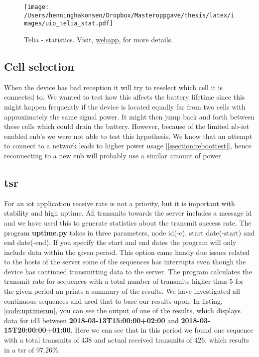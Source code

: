 \documentclass[USenglish]{ifimaster}  %
\begin{document}
\begin{figure}[H]
  \centering
  \texttt{[image: /Users/henninghakonsen/Dropbox/Masteroppgave/thesis/latex/images/uio\_telia\_stat.pdf]}
  \caption{Telia - statistics. Visit, \href{http://158.39.77.97:9000/\#/nodes/id1}{webapp}, for more details.}
  \label{figure:uio_telia_stat}
\end{figure}

\subsection{Cell selection}
When the device has bad reception it will try to reselect which cell it is connected to. We wanted to test how this affects the battery lifetime since this might happen frequently if the device is located equally far from two cells with approximately the same signal power. It might then jump back and forth between these cells which could drain the battery. However, because of the limited \acrshort{nb-iot} enabled \acrshort{enb}'s we were not able to test this hypothesis. We know that an attempt to connect to a network leads to higher power usage [\ref{ssection:reboottest}], hence reconnecting to a new \acrshort{enb} will probably use a similar amount of power.

\subsection{\acrfull{tsr}}
For an \acrshort{iot} application receive rate is not a priority, but it is important with stability and high uptime. All transmits towards the server includes a message id and we have used this to generate statistics about the transmit success rate. The program \textbf{uptime.py} takes in three parameters, node id(-c), start date(-start) and end date(-end). If you specify the start and end dates the program will only include data within the given period. This option came handy due issues related to the hosts of the server some of the sequences has interrupts even though the device has continued transmitting data to the server.
The program calculates the transmit rate for sequences with a total number of transmits higher than 5 for the given period an prints a summary of the results. We have investigated all continuous sequences and used that to base our results upon. In listing, \vref{code:uptimerun}, you can see the output of one of the results, which displays data for id3 between \textbf{2018-03-13T15:00:00+02:00} and \textbf{2018-03-15T20:00:00+01:00}. Here we can see that in this period we found one sequence with a total transmits of 438 and actual received transmits of 426, which results in a \acrshort{tsr} of 97.26\%.
\end{document}

